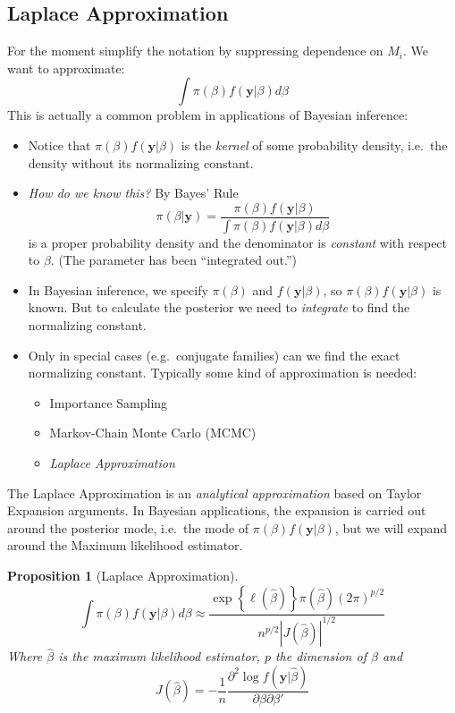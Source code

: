 \documentclass[12pt]{article}
\newtheorem{pro}{Proposition}[section]
\theoremstyle{definition}
\begin{document}
\subsection{Laplace Approximation}
For the moment simplify the notation by suppressing dependence on $M_i$. We want to approximate: 
	$$\int \pi(\beta)f(\mathbf{y}|\beta)d\beta$$
This is actually a common problem in applications of Bayesian inference:
	\begin{itemize} 
		\item Notice that $\pi(\beta)f(\mathbf{y}|\beta)$ is the \emph{kernel} of some probability density, i.e.\ the density without its normalizing constant. 
		\item \emph{How do we know this?} By Bayes' Rule 
	$$\pi(\beta|\mathbf{y}) = \frac{\pi(\beta)f(\mathbf{y}|\beta)}{\int \pi(\beta)f(\mathbf{y}|\beta) d\beta }$$
is a proper probability density and the denominator is \emph{constant} with respect to $\beta$. (The parameter has been ``integrated out.'')
	\item In Bayesian inference, we specify $\pi(\beta)$ and $f(\mathbf{y}|\beta)$, so $\pi(\beta)f(\mathbf{y}|\beta)$ is known. But to calculate the posterior we need to \emph{integrate} to find the normalizing constant.
	\item Only in special cases (e.g.\ conjugate families) can we find the exact normalizing constant. Typically some kind of approximation is needed:  
		\begin{itemize}
			\item Importance Sampling
			\item Markov-Chain Monte Carlo (MCMC)
			\item \emph{Laplace Approximation}
		\end{itemize}
	\end{itemize}
The Laplace Approximation is an \emph{analytical approximation} based on Taylor Expansion arguments. In Bayesian applications, the expansion is carried out around the posterior mode, i.e.\ the mode of $\pi(\beta)f(\mathbf{y}|\beta)$, but we will expand around the Maximum likelihood estimator. 

\begin{pro}[Laplace Approximation]
	\label{pro:laplace}
$$\int \pi(\beta)f(\mathbf{y}|\beta)d\beta \approx \frac{\exp\left\{ \ell(\hat{\beta}) \right\} \pi(\hat{\beta})(2\pi)^{p/2}}{n^{p/2}\left| J(\hat{\beta}) \right|^{1/2}}$$
	Where $\hat{\beta}$ is the \emph{maximum likelihood estimator}, $p$ the dimension of $\beta$ and
		$$J(\hat{\beta}) = -\frac{1}{n} \frac{\partial^2 \log f(\mathbf{y}|\hat{\beta})}{\partial \beta \partial \beta'}$$
\end{pro}
\end{document}
